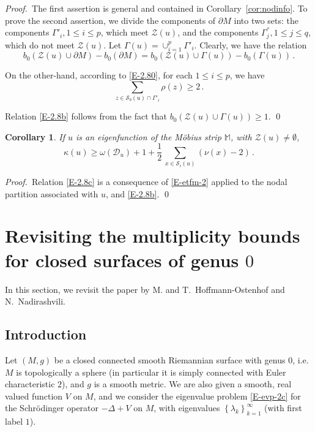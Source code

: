 \documentclass[12pt,a4paper]{amsart}
\theoremstyle{plain} %
\newtheorem{corollary}[theorem]{Corollary}
\theoremstyle{definition}
\numberwithin{equation}{section}
\numberwithin{figure}{section}
\numberwithin{table}{section}
\newcommand{\M}{\mathbb{M}}
\newcommand{\cD}{\mathcal{D}}
\newcommand{\cS}{\mathcal{S}}
\newcommand{\cZ}{\mathcal{Z}}
\newcommand{\pf}{\emph{Proof.~}}
\newcommand{\set}[1]{\left\lbrace #1 \right\rbrace}
\begin{document}
\pf The first assertion is general and contained in Corollary~\ref{cor:nodinfo}. To prove the second assertion, we divide the components of $\partial M$ into two sets: the components $\Gamma'_i, 1 \le i \le p$, which meet $\cZ(u)$, and the components $\Gamma^{''}_j, 1 \le j \le q$, which do not meet $\cZ(u)$. Let $\Gamma(u) = \cup_{i=1}^p\Gamma'_i$. Clearly, we have the relation
%
\begin{equation*}
b_0(\cZ(u) \cup \partial M) -b_0(\partial M) = b_0(\cZ(u) \cup \Gamma(u)) -b_0(\Gamma(u))\,.
\end{equation*}

On the other-hand, according to \eqref{E-2.80}, for each $1 \le i \le p$, we have
%
\begin{equation*}
\sum_{z \in \cS_b(u) \cap \Gamma'_i} \rho(z) \ge 2\,.
\end{equation*}

Relation \eqref{E-2.8b} follows from the fact that $b_0(\cZ(u) \cup \Gamma(u)) \ge 1$. \smallskip
\hfill \qed


\begin{corollary}\label{C-euler-npm}
If $u$ is an eigenfunction of the M\"{o}bius strip $\M$, with $\cZ(u) \neq \emptyset$,
\begin{equation}\label{E-2.8c}
\kappa(u) \geq  \omega(\cD_u) + 1 + \frac 12 \, \sum_{x\in \cS_i(u)} (\nu(x) -2)\,.
\end{equation}
\end{corollary}%

\pf Relation \eqref{E-2.8c} is a consequence of \eqref{E-etfm-2} applied to the nodal partition associated with $u$, and \eqref{E-2.8b}. \hfill \qed


\section{Revisiting the multiplicity bounds for closed surfaces of genus $0$}\label{S-h2n}

In this section, we revisit the paper \cite{HoHN1999} by M. and T.~Hoffmann-Ostenhof and N.~Nadirashvili.

\subsection{Introduction}\label{SS-h2n1}

Let $(M,g)$ be a closed connected smooth Riemannian surface with genus $0$, i.e. $M$ is topologically a sphere (in particular it is simply connected with Euler characteristic $2$), and $g$ is a smooth metric. We are also given a smooth, real valued function $V$ on $M$, and we consider the eigenvalue problem \eqref{E-evp-2c} for the Schr\"{o}dinger operator $-\Delta + V$ on $M$, with eigenvalues $\set{\lambda_k}_{k=1}^{\infty}$ (with first label $1$). \medskip
\end{document}
